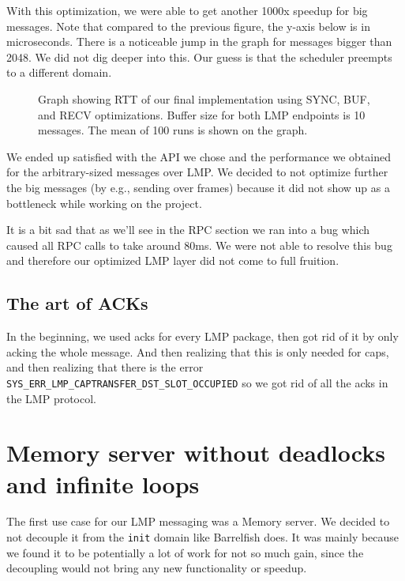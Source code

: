 With this optimization, we were able to get another 1000x speedup for big messages. Note that compared to the previous figure, the y-axis below is in microseconds. There is a noticeable jump in the graph for messages bigger than 2048. We did not dig deeper into this. Our guess is that the scheduler preempts to a different domain. 

\begin{figure}[ht]
    \centering
        \scalebox{0.8}{}
    \caption{Graph showing RTT of our final implementation using SYNC, BUF, and RECV optimizations. Buffer size for both LMP endpoints is 10 messages. The mean of 100 runs is shown on the graph.}
    \label{fig:lmp_rttgood}
\end{figure}

\begin{hindsight}
We ended up satisfied with the API we chose and the performance we obtained for the arbitrary-sized messages over LMP. We decided to not optimize further the big messages (by e.g., sending over frames) because it did not show up as a bottleneck while working on the project.

It is a bit sad that as we'll see in the RPC section we ran into a bug which caused all RPC calls to take around 80ms. We were not able to resolve this bug and therefore our optimized LMP layer did not come to full fruition. 
\end{hindsight}

\subsection{The art of ACKs}
In the beginning, we used acks for every LMP package, then got rid of it by only acking the whole message. And then realizing that this is only needed for caps, and then realizing that there is the error \texttt{SYS_ERR_LMP_CAPTRANSFER_DST_SLOT_OCCUPIED} so we got rid of all the acks in the LMP protocol.

\section{Memory server without deadlocks and infinite loops} \label{sec:mem_server}
The first use case for our LMP messaging was a Memory server. We decided to not decouple it from the \texttt{init} domain like Barrelfish does. It was mainly because we found it to be potentially a lot of work for not so much gain, since the decoupling would not bring any new functionality or speedup.

